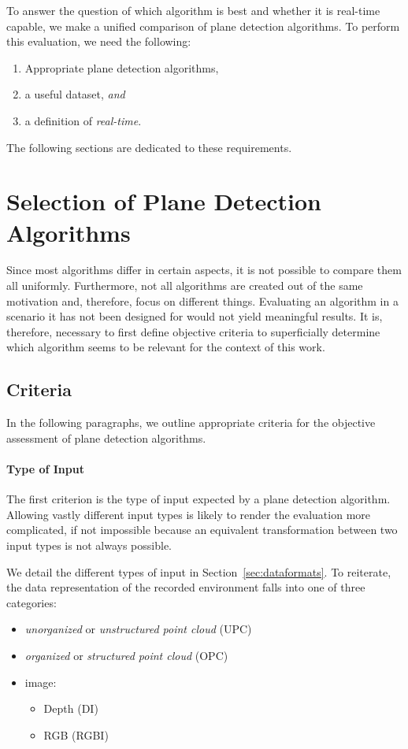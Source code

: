 \documentclass[main.tex]{subfiles}
\begin{document}
To answer the question of which algorithm is best and whether it is real-time capable, we make a unified comparison of plane detection algorithms.
To perform this evaluation, we need the following:

\begin{enumerate}
    \item \label{enum:pda}Appropriate plane detection algorithms,
    \item \label{enum:ds} a useful dataset, \textit{and}
    \item \label{enum:rt} a definition of \textit{real-time}.
\end{enumerate}
The following sections are dedicated to these requirements.

\section{Selection of Plane Detection Algorithms}\label{sec:pdaselection}

Since most algorithms differ in certain aspects, it is not possible to compare them all uniformly.
Furthermore, not all algorithms are created out of the same motivation and, therefore, focus on different things.
Evaluating an algorithm in a scenario it has not been designed for would not yield meaningful results.
It is, therefore, necessary to first define objective criteria to superficially determine which algorithm seems to be relevant
for the context of this work.


\subsection{Criteria}
\label{subsec:criteria}
In the following paragraphs, we outline appropriate criteria for the objective assessment of plane detection algorithms.

\paragraph{Type of Input}\label{par:input}
The first criterion is the type of input expected by a plane detection algorithm.
Allowing vastly different input types is likely to render the evaluation more complicated, if not impossible because an equivalent transformation
between two input types is not always possible.

We detail the different types of input in Section~\ref{sec:dataformats}. To reiterate, the data representation of the recorded
environment falls into one of three categories:
\begin{itemize}
    \item \textit{unorganized} or \textit{unstructured point cloud} (UPC)
    \item \textit{organized} or \textit{structured point cloud} (OPC)
    \item image:
          \begin{itemize}
              \item Depth (DI)
              \item RGB (RGBI)
          \end{itemize}
\end{itemize}
\end{document}

